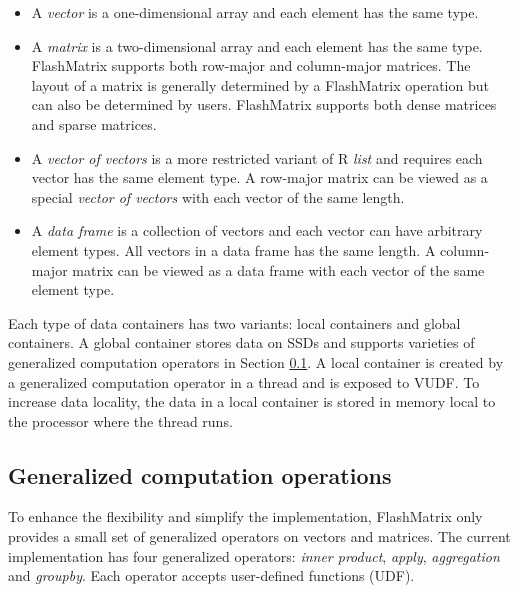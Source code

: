 \begin{itemize}
	\item  A \textit{vector} is a one-dimensional array and each element has
	the same type.
	\item A \textit{matrix} is a two-dimensional array and each element has
	the same type. FlashMatrix supports both row-major and column-major
	matrices. The layout of a matrix is generally determined by a FlashMatrix
	operation but can also be determined by users. FlashMatrix supports both
	dense matrices and sparse matrices.
	\item A \textit{vector of vectors} is a more restricted variant of R
	\textit{list} and requires each vector has the same element type. A row-major
	matrix can be viewed as a special \textit{vector of vectors} with each
	vector of the same length.
	\item A \textit{data frame} is a collection of vectors and each vector can
	have arbitrary element types. All vectors in a data frame has the same length.
	A column-major matrix can be viewed as a data frame with each vector of
	the same element type.
\end{itemize}

Each type of data containers has two variants: local containers and global
containers. A global container stores data on SSDs and supports varieties of
generalized computation operators in Section \ref{sec:generalized}. A local
container is created by a generalized computation operator in a thread and
is exposed to VUDF. To increase data locality, the data in a local container
is stored in memory local to the processor where the thread runs.





\subsection{Generalized computation operations} \label{sec:generalized}
To enhance the flexibility and simplify the implementation, FlashMatrix only
provides a small set of generalized operators on vectors and matrices.
The current implementation has four generalized operators: \textit{inner product},
\textit{apply}, \textit{aggregation} and \textit{groupby}. Each operator
accepts user-defined functions (UDF).

